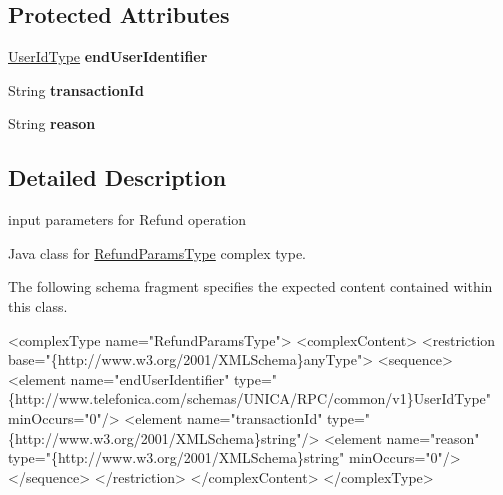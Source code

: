 \subsection*{Protected Attributes}
\begin{DoxyCompactItemize}
\item 
\hypertarget{classcom_1_1telefonica_1_1schemas_1_1unica_1_1rpc_1_1payment_1_1v1_1_1RefundParamsType_aa71cf92dd0cffbb7f30ad929a1b690b3}{
\hyperlink{classcom_1_1telefonica_1_1schemas_1_1unica_1_1rpc_1_1common_1_1v1_1_1UserIdType}{UserIdType} {\bfseries endUserIdentifier}}
\label{classcom_1_1telefonica_1_1schemas_1_1unica_1_1rpc_1_1payment_1_1v1_1_1RefundParamsType_aa71cf92dd0cffbb7f30ad929a1b690b3}

\item 
\hypertarget{classcom_1_1telefonica_1_1schemas_1_1unica_1_1rpc_1_1payment_1_1v1_1_1RefundParamsType_ade6d8494d545bcc49fc57369f02e0904}{
String {\bfseries transactionId}}
\label{classcom_1_1telefonica_1_1schemas_1_1unica_1_1rpc_1_1payment_1_1v1_1_1RefundParamsType_ade6d8494d545bcc49fc57369f02e0904}

\item 
\hypertarget{classcom_1_1telefonica_1_1schemas_1_1unica_1_1rpc_1_1payment_1_1v1_1_1RefundParamsType_a94138990c243a60dc3ddc2baa5dc3586}{
String {\bfseries reason}}
\label{classcom_1_1telefonica_1_1schemas_1_1unica_1_1rpc_1_1payment_1_1v1_1_1RefundParamsType_a94138990c243a60dc3ddc2baa5dc3586}

\end{DoxyCompactItemize}


\subsection{Detailed Description}
input parameters for Refund operation

Java class for \hyperlink{classcom_1_1telefonica_1_1schemas_1_1unica_1_1rpc_1_1payment_1_1v1_1_1RefundParamsType}{RefundParamsType} complex type.

The following schema fragment specifies the expected content contained within this class.


\begin{DoxyPre}
 <complexType name="RefundParamsType">
   <complexContent>
     <restriction base="\{http://www.w3.org/2001/XMLSchema\}anyType">
       <sequence>
         <element name="endUserIdentifier" type="\{http://www.telefonica.com/schemas/UNICA/RPC/common/v1\}UserIdType" minOccurs="0"/>
         <element name="transactionId" type="\{http://www.w3.org/2001/XMLSchema\}string"/>
         <element name="reason" type="\{http://www.w3.org/2001/XMLSchema\}string" minOccurs="0"/>
       </sequence>
     </restriction>
   </complexContent>
 </complexType>
 \end{DoxyPre}
 

